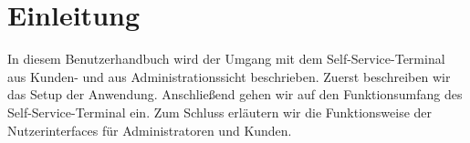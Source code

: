 \section{Einleitung}

In diesem Benutzerhandbuch wird der Umgang mit dem Self-Service-Terminal aus Kunden- und aus Administrationssicht beschrieben. Zuerst beschreiben wir das Setup der Anwendung. Anschließend gehen wir auf den Funktionsumfang des Self-Service-Terminal ein. Zum Schluss erläutern wir die Funktionsweise der Nutzerinterfaces für Administratoren und Kunden.